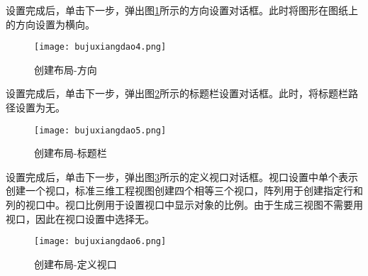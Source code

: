 \begin{procedure}
设置完成后，单击下一步，弹出图\ref{fig:bujuxiangdao4}所示的方向设置对话框。此时将图形在图纸上的方向设置为横向。
\begin{figure}[htbp]
\centering
\texttt{[image: bujuxiangdao4.png]}
\caption{创建布局-方向}\label{fig:bujuxiangdao4}
\end{figure}

设置完成后，单击下一步，弹出图\ref{fig:bujuxiangdao5}所示的标题栏设置对话框。此时，将标题栏路径设置为无。
\begin{figure}[htbp]
\centering
\texttt{[image: bujuxiangdao5.png]}
\caption{创建布局-标题栏}\label{fig:bujuxiangdao5}
\end{figure}

设置完成后，单击下一步，弹出图\ref{fig:bujuxiangdao6}所示的定义视口对话框。视口设置中单个表示创建一个视口，标准三维工程视图创建四个相等三个视口，阵列用于创建指定行和列的视口中。视口比例用于设置视口中显示对象的比例。由于生成三视图不需要用视口，因此在视口设置中选择无。

\begin{figure}[htbp]
\centering
\texttt{[image: bujuxiangdao6.png]}
\caption{创建布局-定义视口}\label{fig:bujuxiangdao6}
\end{figure}


\end{procedure}
